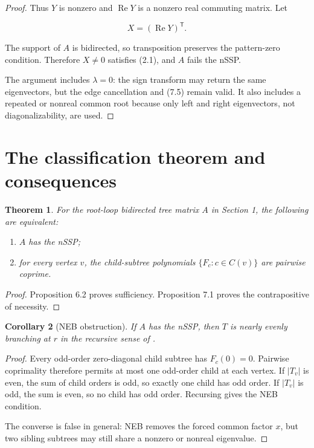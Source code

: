 \documentclass[11pt]{article}
\newtheorem{theorem}{Theorem}[section]
\newtheorem{corollary}[theorem]{Corollary}
\theoremstyle{remark}
\begin{document}
\begin{proof}
Thus $Y$ is nonzero and $\operatorname{Re}Y$ is a nonzero real commuting matrix. Let

\[
X=(\operatorname{Re}Y)^{\mathsf T}.
\]

The support of $A$ is bidirected, so transposition preserves the pattern-zero condition. Therefore $X\ne0$ satisfies (2.1), and $A$ fails the nSSP.

The argument includes $\lambda=0$: the sign transform may return the same eigenvectors, but the edge cancellation and (7.5) remain valid. It also includes a repeated or nonreal common root because only left and right eigenvectors, not diagonalizability, are used.

\end{proof}

\section{The classification theorem and consequences}


\begin{theorem}

For the root-loop bidirected tree matrix $A$ in Section 1, the following are equivalent:

\begin{enumerate}
\item $A$ has the nSSP;
\item for every vertex $v$, the child-subtree polynomials $\{F_c:c\in C(v)\}$ are pairwise coprime.
\end{enumerate}


\end{theorem}

\begin{proof}

Proposition 6.2 proves sufficiency. Proposition 7.1 proves the contrapositive of necessity.

\end{proof}

\begin{corollary}[NEB obstruction]

If $A$ has the nSSP, then $T$ is nearly evenly branching at $r$ in the recursive sense of \cite{ref4}.

\end{corollary}

\begin{proof}

Every odd-order zero-diagonal child subtree has $F_c(0)=0$. Pairwise coprimality therefore permits at most one odd-order child at each vertex. If $|T_v|$ is even, the sum of child orders is odd, so exactly one child has odd order. If $|T_v|$ is odd, the sum is even, so no child has odd order. Recursing gives the NEB condition.

The converse is false in general: NEB removes the forced common factor $x$, but two sibling subtrees may still share a nonzero or nonreal eigenvalue.

\end{proof}
\end{document}
